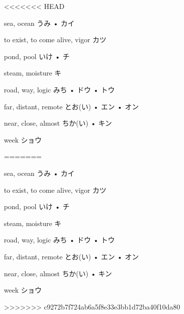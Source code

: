 <<<<<<< HEAD




\setcounter{cardnum}{41}

		{sea, ocean}
		{うみ • カイ}
		{}{}
		{}{}
		{}{}
		{}{}
		{}{}

		{to exist, to come alive, vigor}
		{カツ}
		{}{}
		{}{}
		{}{}
		{}{}
		{}{}

		{pond, pool}
		{いけ • チ}
		{}{}
		{}{}
		{}{}
		{}{}
		{}{}

		{steam, moisture}
		{キ}
		{}{}
		{}{}
		{}{}
		{}{}
		{}{}

		{road, way, logic}
		{みち • ドウ • トウ}
		{}{}
		{}{}
		{}{}
		{}{}
		{}{}

		{far, distant, remote}
		{とお(い) • エン • オン}
		{}{}
		{}{}
		{}{}
		{}{}
		{}{}

		{near, close, almost}
		{ちか(い) • キン}
		{}{}
		{}{}
		{}{}
		{}{}
		{}{}

		{week}
		{ショウ}
		{}{}
		{}{}
		{}{}
		{}{}
		{}{}

=======




\setcounter{cardnum}{41}

		{sea, ocean}
		{うみ • カイ}
		{}{}
		{}{}
		{}{}
		{}{}
		{}{}

		{to exist, to come alive, vigor}
		{カツ}
		{}{}
		{}{}
		{}{}
		{}{}
		{}{}

		{pond, pool}
		{いけ • チ}
		{}{}
		{}{}
		{}{}
		{}{}
		{}{}

		{steam, moisture}
		{キ}
		{}{}
		{}{}
		{}{}
		{}{}
		{}{}

		{road, way, logic}
		{みち • ドウ • トウ}
		{}{}
		{}{}
		{}{}
		{}{}
		{}{}

		{far, distant, remote}
		{とお(い) • エン • オン}
		{}{}
		{}{}
		{}{}
		{}{}
		{}{}

		{near, close, almost}
		{ちか(い) • キン}
		{}{}
		{}{}
		{}{}
		{}{}
		{}{}

		{week}
		{ショウ}
		{}{}
		{}{}
		{}{}
		{}{}
		{}{}

>>>>>>> c9272b7f724ab6a5f8e33e3bb1d72ba40f10da80
